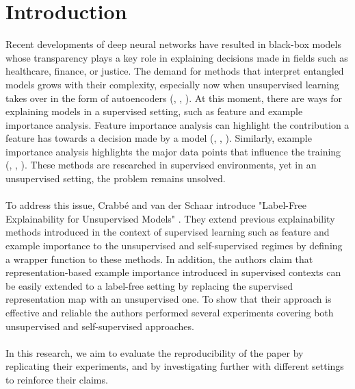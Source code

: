 \section{Introduction}


Recent developments of deep neural networks have resulted in black-box models whose transparency plays a key role in explaining decisions made in fields such as healthcare, finance, or justice. The demand for methods that interpret entangled models grows with their complexity, especially now when unsupervised learning takes over in the form of autoencoders (\cite{BootstrapYourOwnLatent}, \cite{anomalydetectionexample}, \cite{clusteringautoencoders}). At this moment, there are ways for explaining models in a supervised setting, such as feature and example importance analysis. Feature importance analysis can highlight the contribution a feature has towards a decision made by a model (\cite{GradientShap}, \cite{saliency}, \cite{IntegratedGradients}). Similarly, example importance analysis highlights the major data points that influence the training (\cite{dknn}, \cite{tracIn}, \cite{simplex}). These methods are researched in supervised environments, yet in an unsupervised setting, the problem remains unsolved. 
\\ \\
To address this issue, Crabb{\'e} and van der Schaar introduce "Label-Free Explainability for Unsupervised Models" \cite{originalpaper}. They extend previous explainability methods introduced in the context of supervised learning such as feature and example importance to the unsupervised and self-supervised regimes by defining a wrapper function to these methods. In addition, the authors claim that representation-based example importance introduced in supervised contexts can be easily extended to a label-free setting by replacing the supervised representation map with an unsupervised one. To show that their approach is effective and reliable the authors performed several experiments covering both unsupervised and self-supervised approaches. 
\\ \\ 
In this research, we aim to evaluate the reproducibility of the paper by replicating their experiments, and by investigating further with different settings to reinforce their claims.

